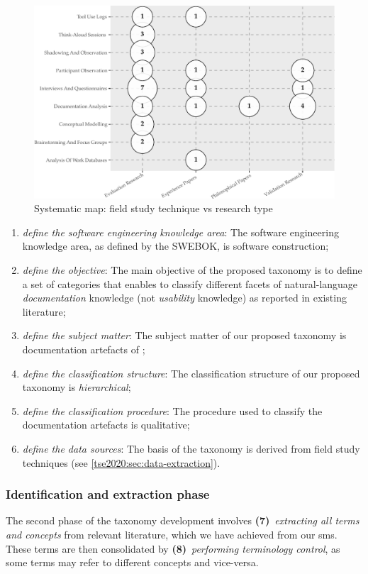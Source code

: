 \begin{figure}[t!]
  \centering
  \includegraphics[width=.8\linewidth]{sms}
  \caption[A systematic map of API documentation knowledge studies]{Systematic map: field study technique vs research type}
  \label{tse2020:fig:sms}
\end{figure}

\begin{enumerate}[label=\textbf{(\arabic*)}]
  \item \textit{define the software engineering knowledge area}: The software engineering knowledge area, as defined by the SWEBOK, is software construction;
  \item \textit{define the objective}: The main objective of the proposed taxonomy is to define a set of categories that enables to classify different facets of natural-language  \textit{documentation} knowledge (not  \textit{usability} knowledge) as reported in existing literature;
  \item \textit{define the subject matter}: The subject matter of our proposed taxonomy is  documentation artefacts of ;
  \item \textit{define the classification structure}: The classification structure of our  proposed taxonomy is \textit{hierarchical};
  \item \textit{define the classification procedure}: The procedure used to classify the documentation artefacts is qualitative; 
  \item \textit{define the data sources}: The basis of the taxonomy is derived from field study techniques (see \cref{tse2020:sec:data-extraction}).
\end{enumerate}

\subsubsection{Identification and extraction phase} The second phase of the taxonomy development involves \textbf{(7)}~\textit{extracting all terms and concepts} from relevant literature, which we have achieved from our \gls{sms}. These terms are then consolidated by \textbf{(8)}~\textit{performing terminology control}, as some terms may refer to different concepts and vice-versa.

